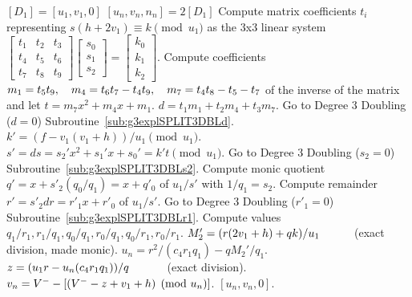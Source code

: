 \begin{algorithm}
\caption{Genus 3 Split Model Degree 3 Doubling\label{alg:g3explSPLIT3DBL}}
\begin{algorithmic} [1]
\Require $[D_1]= [u_1, v_1,0]$ \smallskip
\Ensure $[u_n,v_n,n_n] = 2[D_1]$
\algrule
\State Compute matrix coefficients $t_i$ representing $s(h + 2v_1)\equiv k \pmod{u_1}$ as the 3x3 linear system $ \left[
\begin{smallmatrix} t_1 & t_2 & t_3\\ t_4 & t_5 & t_6\\ t_7 &t_8 & t_9 \end{smallmatrix}\right] \left[
\begin{smallmatrix} s_0\\ s_1 \\s_2 \end{smallmatrix} \right] = \left[ \begin{smallmatrix} k_0\\ k_1\\ k_2 \end{smallmatrix} \right]$.
\State Compute coefficients $m_1 = t_5t_9, \quad m_4 = t_6t_7 - t_4t_9, \quad m_7 = t_4t_8 - t_5-t_7$ of the inverse of the matrix and let $t = m_7x^2 + m_4x + m_1$.
\State $d = t_1m_1 + t_2m_4 + t_3m_7$.
\State Go to Degree 3 Doubling ($d=0$) Subroutine~\ref{sub:g3explSPLIT3DBLd}.
\EndIf
\State $k' = (f - v_1(v_1 + h))/u_1 \pmod{u_1}$.
\State $s' = ds = s_2'x^2 + s_1'x + s_0' =  k't \pmod{u_1}$.
\State Go to Degree 3 Doubling ($s_2=0$) Subroutine~\ref{sub:g3explSPLIT3DBLs2}.
\EndIf
\State Compute monic quotient $q'= x + s'_2(q_0/q_1) = x + q'_0$ of $u_1/s'$ with $1/q_1 = s_2$. 
\State Compute remainder $r' = s'_2dr = r'_1x + r'_0$ of $u_1/s'$.
\State Go to Degree 3 Doubling ($r'_1=0$) Subroutine~\ref{sub:g3explSPLIT3DBLr1}.
\EndIf
\State Compute values $q_1/r_1, r_1/q_1, q_0/q_1, r_0/q_1, q_0/r_1, r_0/r_1$.
\State $M_2' = (r(2v_1 + h) + qk)/u_1 \quad\quad\quad $(exact division, made monic).
\State $u_n = r^2/(c_4r_1q_1) - qM_2'/q_1.$
\State $z = (u_1r - u_n(c_4r_1q_1))/q \quad\quad\quad$ (exact division).
\State $v_n = V^{-} - [(V^{-} - z + v_1 + h) \pmod{u_n}]$.
\State \Return $[u_n,v_n,0]$.
\end{algorithmic}
\end{algorithm}


